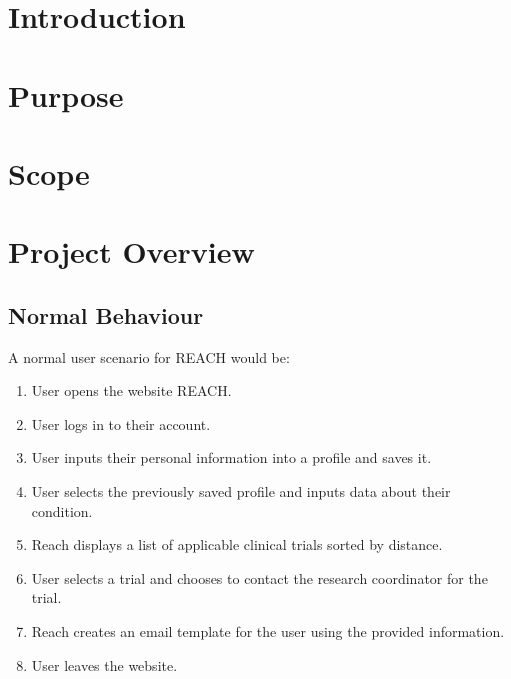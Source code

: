 \documentclass[12pt, titlepage]{article}
\begin{document}
\newpage


\section{Introduction}


\section{Purpose}



\section{Scope}


\section{Project Overview}

\subsection{Normal Behaviour}

A normal user scenario for REACH would be:

\begin{enumerate}
  \item User opens the website REACH.

  \item User logs in to their account.

  \item User inputs their personal information into a profile and saves it.
  
  \item User selects the previously saved profile and inputs data about their condition.
  
  \item Reach displays a list of applicable clinical trials sorted by distance.
  
  \item User selects a trial and chooses to contact the research coordinator for the trial.
  
  \item Reach creates an email template for the user using the provided information.
  
  \item User leaves the website.
\end{enumerate}
\end{document}

